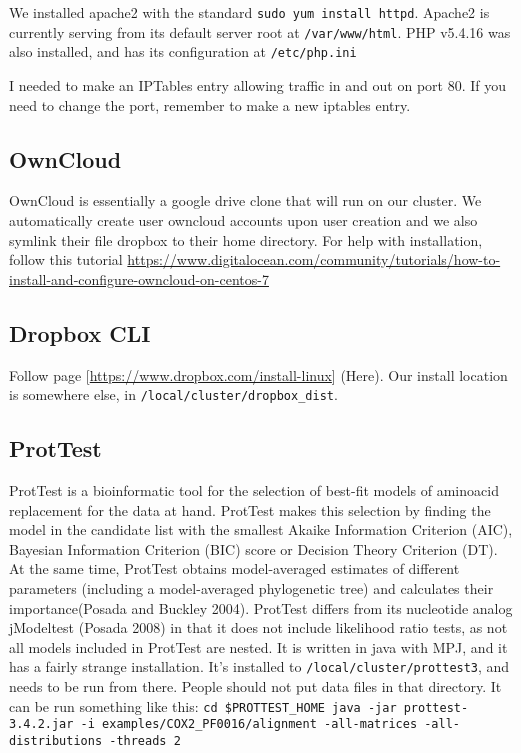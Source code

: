 \documentclass[]{book}
\theoremstyle{definition}
\theoremstyle{definition}
\theoremstyle{definition}
\theoremstyle{remark}
\begin{document}
We installed apache2 with the standard
\texttt{sudo\ yum\ install\ httpd}. Apache2 is currently serving from
its default server root at \texttt{/var/www/html}. PHP v5.4.16 was also
installed, and has its configuration at \texttt{/etc/php.ini}

I needed to make an IPTables entry allowing traffic in and out on port
80. If you need to change the port, remember to make a new iptables
entry.

\subsection{OwnCloud}\label{owncloud}

OwnCloud is essentially a google drive clone that will run on our
cluster. We automatically create user owncloud accounts upon user
creation and we also symlink their file dropbox to their home directory.
For help with installation, follow this tutorial
\href{Here}{https://www.digitalocean.com/community/tutorials/how-to-install-and-configure-owncloud-on-centos-7}

\subsection{Dropbox CLI}\label{dropbox-cli}

Follow page {[}\url{https://www.dropbox.com/install-linux}{]} (Here).
Our install location is somewhere else, in
\texttt{/local/cluster/dropbox\_dist}.

\subsection{ProtTest}\label{prottest}

ProtTest is a bioinformatic tool for the selection of best-fit models of
aminoacid replacement for the data at hand. ProtTest makes this
selection by finding the model in the candidate list with the smallest
Akaike Information Criterion (AIC), Bayesian Information Criterion (BIC)
score or Decision Theory Criterion (DT). At the same time, ProtTest
obtains model-averaged estimates of different parameters (including a
model-averaged phylogenetic tree) and calculates their importance(Posada
and Buckley 2004). ProtTest differs from its nucleotide analog
jModeltest (Posada 2008) in that it does not include likelihood ratio
tests, as not all models included in ProtTest are nested. It is written
in java with MPJ, and it has a fairly strange installation. It's
installed to \texttt{/local/cluster/prottest3}, and needs to be run from
there. People should not put data files in that directory. It can be run
something like this:
\texttt{cd\ \$PROTTEST\_HOME\ java\ -jar\ prottest-3.4.2.jar\ -i\ examples/COX2\_PF0016/alignment\ -all-matrices\ -all-distributions\ -threads\ 2}
\end{document}
